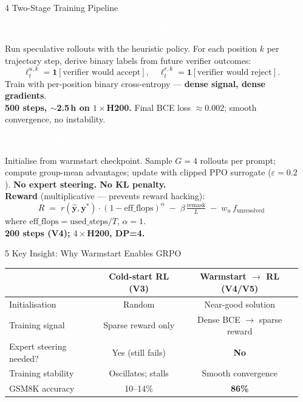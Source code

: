 \documentclass[final]{beamer}
\newcommand{\namedpara}[3]{%
  \par\vspace{4pt}%
  \noindent\colorbox{#1}{\parbox{\dimexpr\linewidth-2\fboxsep}{\textcolor{white}{\bfseries\large\strut #2}}}%
  \par\vspace{2pt}%
  \noindent\colorbox{#1!20!white}{\parbox{\dimexpr\linewidth-2\fboxsep}{\vspace{3pt}#3\vspace{3pt}}}%
  \par\vspace{6pt}%
}
\newlength{\colsep}   \setlength{\colsep}{0.7cm}
\newlength{\colwidth} \setlength{\colwidth}{0.306\paperwidth}
\begin{document}
\begin{frame}[t]
\begin{columns}[t]
\begin{column}{\colwidth}
\end{column}

\hspace{\colsep}
\begin{column}{\colwidth}

\begin{block}{4 \quad Two-Stage Training Pipeline}

\namedpara{accentgreen}{Stage 1 — Supervised Warmstart (dense BCE)}{%
  Run speculative rollouts with the heuristic policy.
  For each position $k$ per trajectory step, derive binary labels from
  future verifier outcomes:
  \[
    \ell_t^{u,k} = \mathbf{1}[\text{verifier would accept}],\quad
    \ell_t^{r,k} = \mathbf{1}[\text{verifier would reject}].
  \]
  Train with per-position binary cross-entropy — \textbf{dense signal,
  dense gradients}.\\[5pt]
  \textbf{500 steps, ${\sim}$2.5\,h on $1{\times}$H200.}
  Final BCE loss ${\approx}0.002$; smooth convergence, no instability.
}

\namedpara{primaryblue}{Stage 2 — GRPO (Reinforcement Learning)}{%
  Initialise from warmstart checkpoint.
  Sample $G{=}4$ rollouts per prompt; compute group-mean advantages;
  update with clipped PPO surrogate ($\varepsilon{=}0.2$).
  \textbf{No expert steering. No KL penalty.}\\[5pt]
  \textbf{Reward} (multiplicative — prevents reward hacking):
  \[
    R \;=\; r(\hat{\mathbf{y}},\mathbf{y}^*)
          \cdot(1 - \mathrm{eff\_flops})^\alpha
          \;-\; \beta\,\tfrac{\text{remask}}{L}
          \;-\; w_u\,f_{\text{unresolved}}
  \]
  where $\mathrm{eff\_flops} = \mathrm{used\_steps}/T$, $\alpha{=}1$.\\[5pt]
  \textbf{200 steps (V4); $4{\times}$H200, DP=4.}
}

\end{block}

\begin{block}{5 \quad Key Insight: Why Warmstart Enables GRPO}

\begin{center}
\setlength{\tabcolsep}{7pt}
\renewcommand{\arraystretch}{1.35}
\begin{tabular}{lcc}
\toprule
 & \textbf{Cold-start RL (V3)} & \textbf{Warmstart $\to$ RL (V4/V5)} \\
\midrule
Initialisation & Random & Near-good solution \\
Training signal & Sparse reward only & Dense BCE $\to$ sparse reward \\
Expert steering needed? & Yes (still fails) & \textbf{No} \\
Training stability & Oscillates; stalls & Smooth convergence \\
GSM8K accuracy & 10--14\% & \textbf{86\%} \\
\bottomrule
\end{tabular}
\end{center}


\end{block}
\end{column}
\end{columns}
\end{frame}
\end{document}

